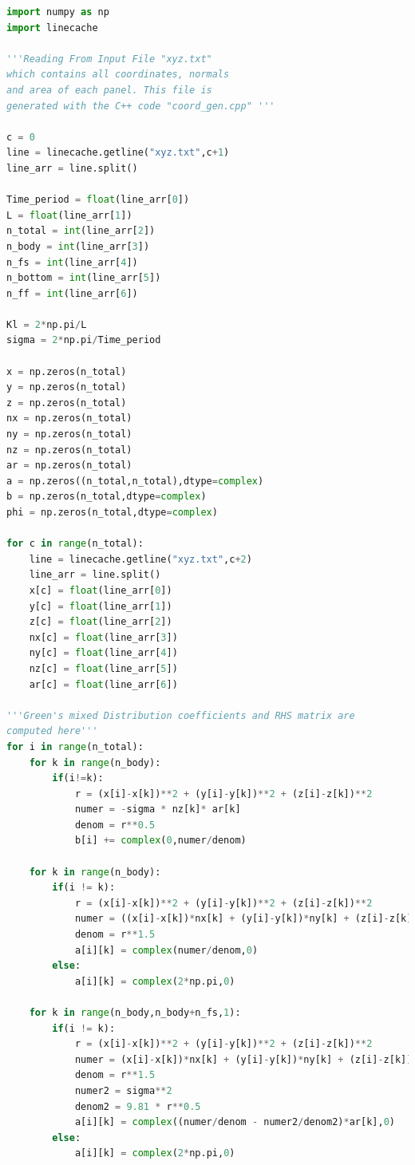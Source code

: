 \documentclass[a4paper]{article} %
\begin{document}
\begin{lstlisting}[language=Python, breaklines=true]
import numpy as np
import linecache

'''Reading From Input File "xyz.txt"
which contains all coordinates, normals
and area of each panel. This file is
generated with the C++ code "coord_gen.cpp" '''

c = 0
line = linecache.getline("xyz.txt",c+1)
line_arr = line.split()

Time_period = float(line_arr[0])
L = float(line_arr[1])
n_total = int(line_arr[2])
n_body = int(line_arr[3])
n_fs = int(line_arr[4])
n_bottom = int(line_arr[5])
n_ff = int(line_arr[6])

Kl = 2*np.pi/L
sigma = 2*np.pi/Time_period

x = np.zeros(n_total)
y = np.zeros(n_total)
z = np.zeros(n_total)
nx = np.zeros(n_total)
ny = np.zeros(n_total)
nz = np.zeros(n_total)
ar = np.zeros(n_total)
a = np.zeros((n_total,n_total),dtype=complex)
b = np.zeros(n_total,dtype=complex)
phi = np.zeros(n_total,dtype=complex)

for c in range(n_total):
    line = linecache.getline("xyz.txt",c+2)
    line_arr = line.split()
    x[c] = float(line_arr[0])
    y[c] = float(line_arr[1])
    z[c] = float(line_arr[2])
    nx[c] = float(line_arr[3])
    ny[c] = float(line_arr[4])
    nz[c] = float(line_arr[5])
    ar[c] = float(line_arr[6])

'''Green's mixed Distribution coefficients and RHS matrix are 
computed here'''
for i in range(n_total):
    for k in range(n_body):
        if(i!=k):
            r = (x[i]-x[k])**2 + (y[i]-y[k])**2 + (z[i]-z[k])**2
            numer = -sigma * nz[k]* ar[k]
            denom = r**0.5
            b[i] += complex(0,numer/denom)

    for k in range(n_body):
        if(i != k):
            r = (x[i]-x[k])**2 + (y[i]-y[k])**2 + (z[i]-z[k])**2
            numer = ((x[i]-x[k])*nx[k] + (y[i]-y[k])*ny[k] + (z[i]-z[k])*nz[k])*ar[k]
            denom = r**1.5
            a[i][k] = complex(numer/denom,0)
        else:
            a[i][k] = complex(2*np.pi,0)
    
    for k in range(n_body,n_body+n_fs,1):
        if(i != k):
            r = (x[i]-x[k])**2 + (y[i]-y[k])**2 + (z[i]-z[k])**2
            numer = (x[i]-x[k])*nx[k] + (y[i]-y[k])*ny[k] + (z[i]-z[k])*nz[k]
            denom = r**1.5
            numer2 = sigma**2
            denom2 = 9.81 * r**0.5
            a[i][k] = complex((numer/denom - numer2/denom2)*ar[k],0)
        else:
            a[i][k] = complex(2*np.pi,0)


\end{lstlisting}
\end{document}
